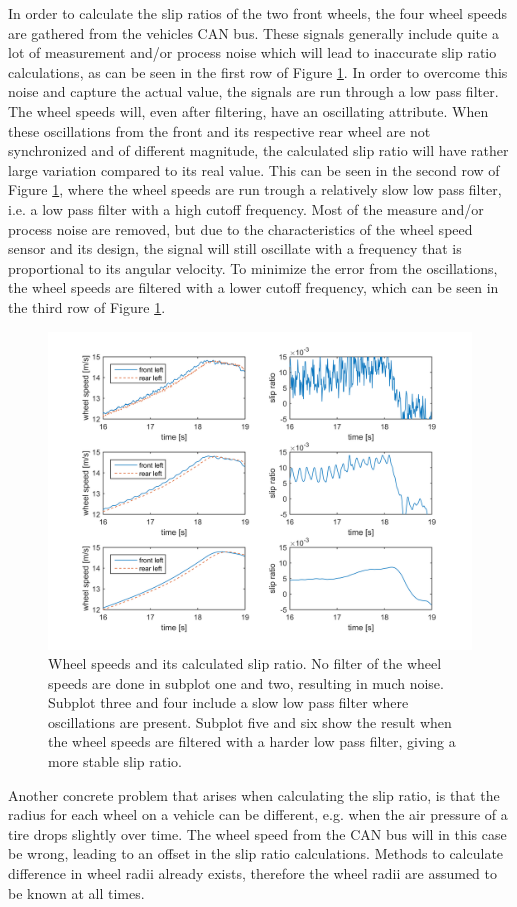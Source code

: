 In order to calculate the slip ratios of the two front wheels, the four wheel speeds are gathered from the vehicles CAN bus. These signals generally include quite a lot of measurement and/or process noise which will lead to inaccurate slip ratio calculations, as can be seen in the first row of Figure \ref{wheel_speed_and_slip}. In order to overcome this noise and capture the actual value, the signals are run through a low pass filter. The wheel speeds will, even after filtering, have an oscillating attribute. When these oscillations from the front and its respective rear wheel are not synchronized and of different magnitude, the calculated slip ratio will have rather large variation compared to its real value. This can be seen in the second row of Figure \ref{wheel_speed_and_slip}, where the wheel speeds are run trough a relatively slow low pass filter, i.e. a low pass filter with a high cutoff frequency. Most of the measure and/or process noise are removed, but due to the characteristics of the wheel speed sensor and its design, the signal will still oscillate with a frequency that is proportional to its angular velocity. To minimize the error from the oscillations, the wheel speeds are filtered with a lower cutoff frequency, which can be seen in the third row of Figure \ref{wheel_speed_and_slip}. 
\begin{figure}[h]
	\centering
	\includegraphics[width=1.0\textwidth]{Pictures/wheel_speed_and_slip}
	\caption {Wheel speeds and its calculated slip ratio. No filter of the wheel speeds are done in subplot one and two, resulting in much noise. Subplot three and four include a slow low pass filter where oscillations are present. Subplot five and six show the result when the wheel speeds are filtered with a harder low pass filter, giving a more stable slip ratio.}
	\label{wheel_speed_and_slip}
\end{figure}
Another concrete problem that arises when calculating the slip ratio, is that the radius for each wheel on a vehicle can be different, e.g. when the air pressure of a tire drops slightly over time. The wheel speed from the CAN bus will in this case be wrong, leading to an offset in the slip ratio calculations. Methods to calculate difference in wheel radii already exists, therefore the wheel radii are assumed to be known at all times.

